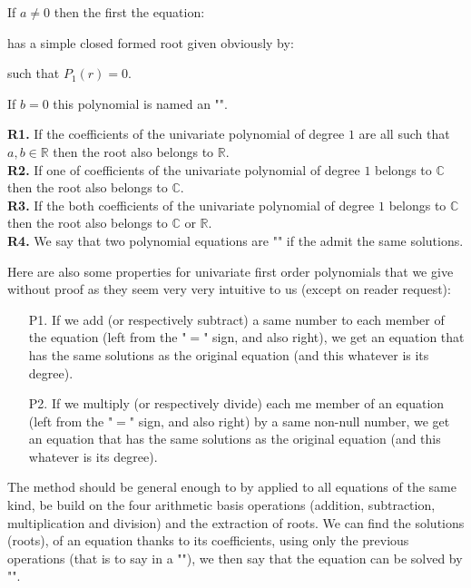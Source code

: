 	If $a\neq 0$ then the first the equation:
	
	has a simple closed formed root given obviously by:
	
	such that $P_1(r)=0$.
	
	If $b=0$ this polynomial is named an "".
	
	\begin{tcolorbox}[title=Remarks,colframe=black,arc=10pt]
	\textbf{R1.} If the coefficients of the univariate polynomial of degree $1$ are all such that  $a,b\in \mathbb{R}$ then the root also belongs to $\mathbb{R}$.\\
	
	\textbf{R2.} If one of coefficients of the univariate polynomial of degree $1$ belongs to $\mathbb{C}$ then the root also belongs to $\mathbb{C}$.\\
	
	\textbf{R3.} If the both coefficients of the univariate polynomial of degree $1$ belongs to $\mathbb{C}$ then the root also belongs to $\mathbb{C}$ or $\mathbb{R}$.\\
	
	\textbf{R4.} We say that two polynomial equations are "" if the admit the same solutions.
	\end{tcolorbox}
	Here are also some properties for univariate first order polynomials that we give without proof as they seem very very intuitive to us (except on reader request):
	\begin{enumerate}
		\item[P1.] If we add (or respectively subtract) a same number to each member of the equation (left from the "$=$" sign, and also right), we get an equation that has the same solutions as the original equation (and this whatever is its degree).
	
		\item[P2.] If we multiply (or respectively divide) each me member of an equation (left from the "$=$" sign, and also right) by a same non-null number, we get an equation that has the same solutions as the original equation (and this whatever is its degree).
	\end{enumerate}
	The method should be general enough to by applied to all equations of the same kind, be build on the four arithmetic basis operations (addition, subtraction, multiplication and division) and the extraction of roots. We can find the solutions (roots), of an equation thanks to its coefficients, using only the previous operations (that is to say in a ""), we then say that the equation can be solved by "".
	
